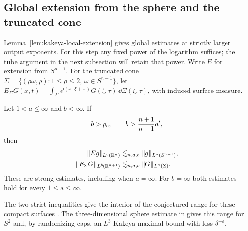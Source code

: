 \subsection{Global extension from the sphere and the truncated cone}
\label{sec:strict-extension}

Lemma~\ref{lem:kakeya-local-extension} gives global estimates at strictly
larger output exponents. For this step any fixed power of the logarithm
suffices; the tube argument in the next subsection will retain that power.
Write \(E\) for extension from \(S^{n-1}\).
For the truncated cone
\(\Sigma=\{(\rho\omega,\rho):1\le\rho\le2,\ \omega\in S^{n-1}\}\),
let \(E_\Sigma G(x,t)=\int_\Sigma e^{\mathrm i(x\cdot\xi+t\tau)}
G(\xi,\tau)\,\dd\Sigma(\xi,\tau)\), with induced surface measure.

\begin{corollary}\label{cor:spherical-restriction}\label{cor:cone-extension}
Let \(1<a\le\infty\) and \(b<\infty\). If
\[
 b>p_{\mathrm c},\qquad b>\frac{n+1}{n-1}a',
\]
then
\begin{align}
 \|Eg\|_{L^b(\mathbb R^n)}
 &\lesssim_{n,a,b} \|g\|_{L^a(S^{n-1})},\label{eq:spherical-extension-mixed}\\
 \|E_\Sigma G\|_{L^b(\mathbb R^{n+1})}
 &\lesssim_{n,a,b} \|G\|_{L^a(\Sigma)}.\label{eq:cone-extension}
\end{align}
These are strong estimates, including when \(a=\infty\).
For \(b=\infty\) both estimates hold for every \(1\le a\le\infty\).
\end{corollary}

The two strict inequalities give the interior of the conjectured range
for these compact surfaces \cite[Conjecture~1.1(i)]{Nicola2009}.
The three-dimensional sphere estimate in
\cite[\S\S9.1--9.2]{OpenAI2026SphereRestriction} gives this range for
\(S^2\) and, by randomizing caps, an \(L^3\) Kakeya maximal bound with
loss \(\delta^{-\varepsilon}\).

